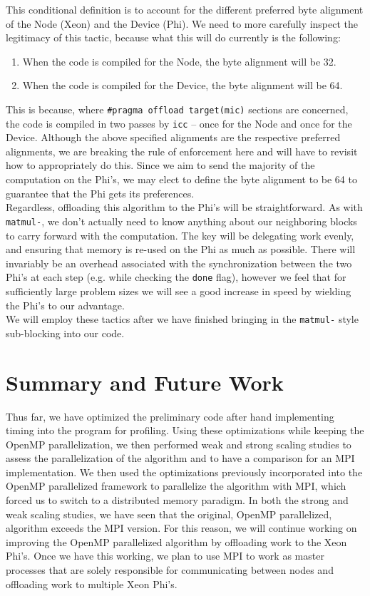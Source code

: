 \documentclass[11pt]{article}
\begin{document}
\noindent This conditional definition is to account for the different preferred byte alignment of the Node (Xeon) and the Device (Phi).  We need to more carefully inspect the legitimacy of this tactic, because what this will do currently is the following:

\begin{enumerate}[1.]
  \item When the code is compiled for the Node, the byte alignment will be 32.
  \item When the code is compiled for the Device, the byte alignment will be 64.
\end{enumerate}

\noindent This is because, where \texttt{\#pragma offload target(mic)} sections are concerned, the code is compiled in two passes by \texttt{icc} -- once for the Node and once for the Device.  Although the above specified alignments are the respective preferred alignments, we are breaking the rule of enforcement here and will have to revisit how to appropriately do this.  Since we aim to send the majority of the computation on the Phi's, we may elect to define the byte alignment to be 64 to guarantee that the Phi gets its preferences.\\

\noindent Regardless, offloading this algorithm to the Phi's will be straightforward.  As with \texttt{matmul-}, we don't actually need to know anything about our neighboring blocks to carry forward with the computation.  The key will be delegating work evenly, and ensuring that memory is re-used on the Phi as much as possible.  There will invariably be an overhead associated with the synchronization between the two Phi's at each step (e.g. while checking the \texttt{done} flag), however we feel that for sufficiently large problem sizes we will see a good increase in speed by wielding the Phi's to our advantage.\\

\noindent We will employ these tactics after we have finished bringing in the \texttt{matmul-} style sub-blocking into our code.

\section{Summary and Future Work}
Thus far, we have optimized the preliminary code after hand implementing timing into the program for profiling. Using these optimizations while keeping the OpenMP parallelization, we then performed weak and strong scaling studies to assess the parallelization of the algorithm and to have a comparison for an MPI implementation. We then used the optimizations previously incorporated into the OpenMP parallelized framework to parallelize the algorithm with MPI, which forced us to switch to a distributed memory paradigm. In both the strong and weak scaling studies, we have seen that the original, OpenMP parallelized, algorithm exceeds the MPI version. For this reason, we will continue working on improving the OpenMP parallelized algorithm by offloading work to the Xeon Phi's. Once we have this working, we plan to use MPI to work as master processes that are solely responsible for communicating between nodes and offloading work to multiple Xeon Phi's. 
\end{document}

